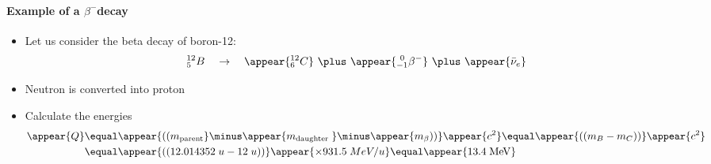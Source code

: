 \begin{frame}
\frametitle{\texorpdfstring{\culine[\sectiontitleulinecolor]{\sectiontitle}}{\sectiontitle} }
\framesubtitle{Example of a $\beta^{-}$decay}

%
\begin{itemize}
	\item Let us consider the beta decay of boron-12:
\[
{ }_{5}^{12} B \quad \rightarrow \quad \appear{{ }_{6}^{12} C}  ~\plus~ \appear{{ }_{-1}^{~0} \beta^{-}}  ~\plus~ \appear{\bar{\nu}_{e}}
\]

\item Neutron is converted into proton  

\item Calculate the energies  
$$
\begin{aligned}
\appear{Q} & \equal  \appear{\textrm{((} m_{\text {parent}}} \minus \appear{m_{\text {daughter }}}  \minus \appear{m_{\beta} \textrm{))}}  \appear{c^{2}}  \equal  \appear{\textrm{((} m_{B}-m_{C} \textrm{))}}  \appear{c^{2}} \\
&  \equal \appear{ \textrm{((} 12.014352 \;u-12 \;u \textrm{))}} \appear{\times 931.5 \;MeV / u} \equal \appear{13.4 \mathrm{\;MeV}}
\end{aligned}
$$
\end{itemize}


\endofslide 
\end{frame}

